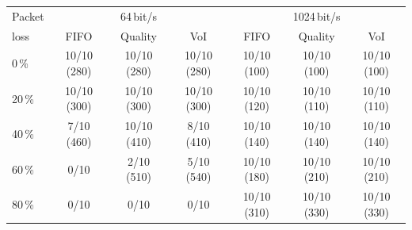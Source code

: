 \begin{tabular}{lcccccc}
\toprule
Packet & \multicolumn{3}{c}{64\,bit/s} & \multicolumn{3}{c}{1024\,bit/s} \\
loss & FIFO & Quality & VoI & FIFO & Quality & VoI \\
\midrule
0\,\% & 10/10 (280) & 10/10 (280) & 10/10 (280) & 10/10 (100) & 10/10 (100) & 10/10 (100) \\
20\,\% & 10/10 (300) & 10/10 (300) & 10/10 (300) & 10/10 (120) & 10/10 (110) & 10/10 (110) \\
40\,\% & 7/10 (460) & 10/10 (410) & 8/10 (410) & 10/10 (140) & 10/10 (140) & 10/10 (140) \\
60\,\% & 0/10 & 2/10 (510) & 5/10 (540) & 10/10 (180) & 10/10 (210) & 10/10 (210) \\
80\,\% & 0/10 & 0/10 & 0/10 & 10/10 (310) & 10/10 (330) & 10/10 (330) \\
\bottomrule
\end{tabular}
